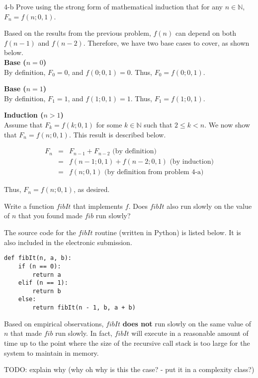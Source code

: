 \documentclass[11pt]{article}
\begin{document}
\begin{prob}{4-b}
Prove using the strong form of mathematical induction that for any $n \in \mathbb{N}$, $F_{n} = f(n;0,1)$.
\end{prob}
\begin{sol} 
Based on the results from the previous problem, $f(n)$ can depend on both $f(n-1)$ and $f(n-2)$. Therefore, we have two base cases to cover, as shown below. \\

\textbf{Base ($n = 0$)} \\
By definition, $F_{0} = 0$, and $f(0;0,1) = 0$. Thus, $F_{0} = f(0;0,1)$.

\textbf{Base ($n = 1$)} \\
By definition, $F_{1} = 1$, and $f(1;0,1) = 1$. Thus, $F_{1} = f(1;0,1)$.

\textbf{Induction ($n > 1$)} \\
Assume that $F_{k} = f(k;0,1)$ for some $k \in \mathbb{N}$ such that $2 \leq k < n$. We now show that $F_{n} = f(n;0,1)$. This result is described below.

\begin{eqnarray*}
F_{n} & = & F_{n - 1} + F_{n - 2} \text{ (by definition)} \\
& = & f(n - 1;0,1) + f(n-2;0,1) \text{ (by induction)} \\
& = & f(n;0,1) \text{ (by definition from problem 4-a)}
\end{eqnarray*}

Thus, $F_{n} = f(n;0,1)$, as desired.

\end{sol}

\begin{prob}{5}
Write a function $fibIt$ that implements $f$. Does $fibIt$ also run slowly on the value of $n$ that you found made $fib$ run slowly?
\end{prob}
\begin{sol} 
The source code for the $fibIt$ routine (written in Python) is listed below. It is also included in the electronic submission.

\begin{lstlisting}
def fibIt(n, a, b):
	if (n == 0):
		return a
	elif (n == 1):
		return b
	else:
		return fibIt(n - 1, b, a + b)
\end{lstlisting}
\end{sol}

Based on empirical observations, $fibIt$ \textbf{does not} run slowly on the same value of $n$ that made $fib$ run slowly. In fact, $fibIt$ will execute in a reasonable amount of time up to the point where the size of the recursive call stack is too large for the system to maintain in memory. 

TODO: explain why (why oh why is this the case? - put it in a complexity class?)
\end{document}
